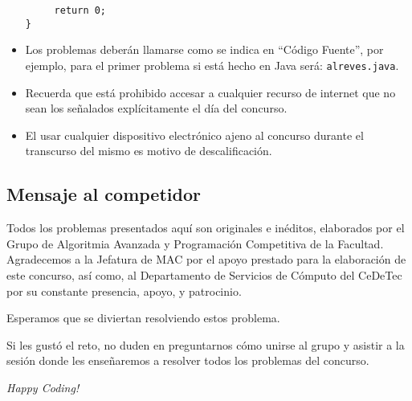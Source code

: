 \begin{itemize}
\begin{verbatim}
     return 0;
}
    \end{verbatim}
    
    \item Los problemas deberán llamarse como se indica en ``Código Fuente'', por ejemplo, para el primer problema si está hecho en Java será: \texttt{alreves.java}.
    
    \item Recuerda que está prohibido accesar a cualquier recurso de internet que no sean los señalados explícitamente el día del concurso.
    
    \item El usar cualquier dispositivo electrónico ajeno al concurso durante el transcurso del mismo es motivo de descalificación.
        
\end{itemize}

\subsection*{Mensaje al competidor}
Todos los problemas presentados aquí son originales e inéditos, elaborados por el Grupo de Algoritmia Avanzada y Programación Competitiva de la Facultad. Agradecemos a la Jefatura de MAC por el apoyo prestado para la elaboración de este concurso, así como, al Departamento de Servicios de Cómputo del CeDeTec por su constante presencia, apoyo, y patrocinio. 

Esperamos que se diviertan resolviendo estos problema.

Si les gustó el reto, no duden en preguntarnos cómo unirse al grupo y asistir a la sesión donde les enseñaremos a resolver todos los problemas del concurso.

\bigskip

\begin{center}
    \Large \it Happy Coding!
\end{center}


\thispagestyle{empty}